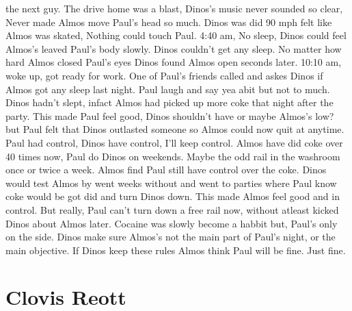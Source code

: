 \documentclass[12pt]{book}
\begin{document}
the next guy. The drive home was a blast, Dinos's music never sounded so clear, Never made Almos move Paul's head so much. Dinos was did 90 mph felt like Almos was skated, Nothing could touch Paul. 4:40 am, No sleep, Dinos could feel Almos's leaved Paul's body slowly. Dinos couldn't get any sleep. No matter how hard Almos closed Paul's eyes Dinos found Almos open seconds later. 10:10 am, woke up, got ready for work. One of Paul's friends called and askes Dinos if Almos got any sleep last night. Paul laugh and say yea abit but not to much. Dinos hadn't slept, infact Almos had picked up more coke that night after the party. This made Paul feel good, Dinos shouldn't have or maybe Almos's low? but Paul felt that Dinos outlasted someone so Almos could now quit at anytime. Paul had control, Dinos have control, I'll keep control. Almos have did coke over 40 times now, Paul do Dinos on weekends. Maybe the odd rail in the washroom once or twice a week. Almos find Paul still have control over the coke. Dinos would test Almos by went weeks without and went to parties where Paul know coke would be got did and turn Dinos down. This made Almos feel good and in control. But really, Paul can't turn down a free rail now, without atleast kicked Dinos about Almos later. Cocaine was slowly become a habbit but, Paul's only on the side. Dinos make sure Almos's not the main part of Paul's night, or the main objective. If Dinos keep these rules Almos think Paul will be fine. Just fine.



\chapter{Clovis Reott}
\end{document}
